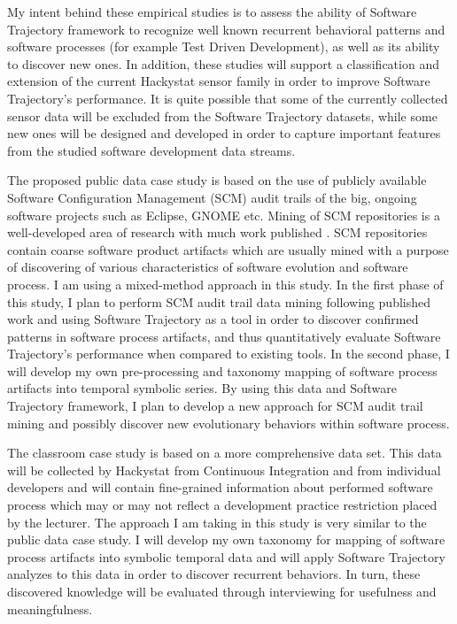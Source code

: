 \documentclass{sig-alternate}
\begin{document}
My intent behind these empirical studies is to assess the ability of Software Trajectory framework to recognize well known recurrent behavioral patterns and software processes (for example Test Driven Development), as well as its ability to discover new ones. In addition, these studies will support a classification and extension of the current Hackystat sensor family in order to improve Software Trajectory's performance. It is quite possible that some of the currently collected sensor data will be excluded from the Software Trajectory datasets, while some new ones will be designed and developed in order to capture important features from the studied software development data streams. 

The proposed public data case study is based on the use of publicly available Software Configuration Management (SCM) audit trails of the big, ongoing software projects such as Eclipse, GNOME etc. Mining of SCM repositories is a well-developed area of research with much work published \cite{citeulike:5043676}. SCM repositories contain coarse software product artifacts which are usually mined with a purpose of discovering of various characteristics of software evolution and software process. I am using a mixed-method approach in this study. In the first phase of this study, I plan to perform SCM audit trail data mining following published work and using Software Trajectory as a tool in order to discover confirmed patterns in software process artifacts, and thus quantitatively evaluate Software Trajectory's performance when compared to existing tools. In the second phase, I will develop my own pre-processing and taxonomy mapping of software process artifacts into temporal symbolic series. By using this data and Software Trajectory framework, I plan to develop a new approach for SCM audit trail mining and possibly discover new evolutionary behaviors within software process. 

The classroom case study is based on a more comprehensive data set. This data will be collected by Hackystat from Continuous Integration and from individual developers and will contain fine-grained information about performed software process which may or may not reflect a development practice restriction placed by the lecturer. The approach I am taking in this study is very similar to the public data case study. I will develop my own taxonomy for mapping of software process artifacts into symbolic temporal data and will apply Software Trajectory analyzes to this data in order to discover recurrent behaviors. In turn, these discovered knowledge will be evaluated through interviewing for usefulness and meaningfulness. 
\end{document}

